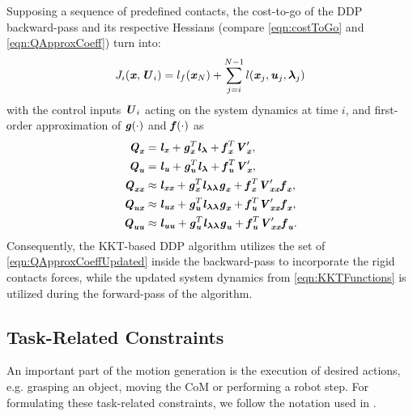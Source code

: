 Supposing a sequence of predefined contacts, the cost-to-go of the \gls{DDP} backward-pass and its respective Hessians (compare \cref{eqn:costToGo} and \ref{eqn:QApproxCoeff}) turn into:
\begin{equation*}\label{eqn:CostToGoUpdated}
J_i(\myM{x}, \myM{U}_i)=l_f(\myM{x}_N)+\sum_{j=i}^{N-1}l(\myM{x}_j,\myM{u}_j,\myM{\lambda}_j)
\end{equation*}
with the control inputs $\myM{U}_i$ acting on the system dynamics at time $i$, and first-order approximation of $\myM{g}(\cdot)$ and $\myM{f}(\cdot)$ as
\begin{align}\label{eqn:QApproxCoeffUpdated}
\begin{split}
\bQ_{\bx} &= \bl_{\bx}+\myM{g}_{\bx}^T\bl_{\myM{\lambda}}+\bfun_{\bx}^T \bV_{\bx}^\prime, \\
\bQ_{\bu} &= \bl_{\bu}+\myM{g}_{\bu}^T\bl_{\myM{\lambda}}+\bfun_{\bu}^T \bV_{\bx}^\prime, \\
\bQ_{\bx\bx} &\approx \bl_{\bx\bx}+\myM{g}_{\bx}^T\bl_{\myM{\lambda\lambda}}\myM{g}_{\bx}+\bfun_{\bx}^T \bV_{\bx\bx}^\prime\bfun_{\bx},\\
\bQ_{\bu\bx} &\approx \bl_{\bu\bx}+\myM{g}_{\bu}^T\bl_{\myM{\lambda\lambda}}\myM{g}_{\bx}+\bfun_{\bu}^T \bV_{\bx\bx}^\prime\bfun_{\bx},\\
\bQ_{\bu\bu} &\approx \bl_{\bu\bu}+\myM{g}_{\bu}^T\bl_{\myM{\lambda\lambda}}\myM{g}_{\bu}+\bfun_{\bu}^T \bV_{\bx\bx}^\prime\bfun_{\bu}.
\end{split}
\end{align}
Consequently, the \gls{KKT}-based \gls{DDP} algorithm utilizes the set of \cref{eqn:QApproxCoeffUpdated} inside the backward-pass to incorporate the rigid contacts forces, while the updated system dynamics from \cref{eqn:KKTFunctions} is utilized during the forward-pass of the algorithm. 

\subsection{Task-Related Constraints}
An important part of the motion generation is the execution of desired actions, e.g. grasping an object, moving the \gls{CoM} or performing a robot step. For formulating these task-related constraints, we follow the notation used in \cite{giraud2020motion}.

